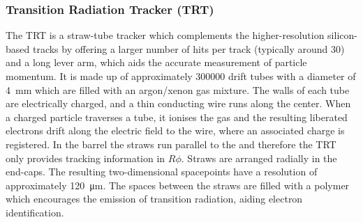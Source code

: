 \subsubsection{Transition Radiation Tracker (TRT)}
The TRT is a straw-tube tracker which complements the higher-resolution silicon-based tracks by offering a larger number of hits per track (typically around 30) and a long lever arm, which aids the accurate measurement of particle momentum. 
It is made up of approximately \num{300000} drift tubes with a diameter of \SI{4}{\milli\meter} which are filled with an argon/xenon gas mixture.
The walls of each tube are electrically charged, and a thin conducting wire runs along the center.
When a charged particle traverses a tube, it ionises the gas and the resulting liberated electrons drift along the electric field to the wire, where an associated charge is registered.
In the barrel the straws run parallel to the  and therefore the TRT only provides tracking information in $R\phi$. Straws are arranged radially in the end-caps. The resulting two-dimensional spacepoints have a resolution of approximately \SI{120}{\micro\meter}.
The spaces between the straws are filled with a polymer which encourages the emission of transition radiation, aiding electron identification.





